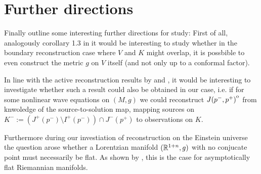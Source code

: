 \chapter*{Further directions}
Finally outline some interesting further directions for study: First of all, analogously corollary 1.3 in \cite{kurylev2017inverse} it would be interesting to study whether in the boundary reconstruction case where $V$ and $K$ might overlap, it is possbible to even construct the metric $g$ on $V$ itself (and not only up to a conformal factor).

In line with the active reconstruction results by \cite{wang2019inverse} and \cite{lassas2018inverse}, it would be interesting to investigate whether such a result could also be obtained in our case, i.e. if for some nonlinear wave equations on $(M,g)$ we could reconstruct ${\kern0ptJ(p^-,p^+)}^{\mathrm{o}}$ from knwoledge of the source-to-solution map, mapping sources on $K^-:= (J^+(p^-)\setminus I^+(p^-)) \cap J^-(p^+)$ to observations on $K$.

Furthermore during our investiation of reconstruction on the Einstein universe the question arose whether a Lorentzian manifold $(\mathbb{R}^{1+n},g)$ with no conjucate point must necessarily be flat. As shown by \citet{guillarmou2019asymptotically}, this is the case for asymptotically flat Riemannian manifolds.